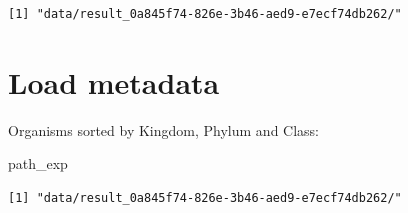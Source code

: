 \documentclass[
  letterpaper,
  DIV=11,
  numbers=noendperiod]{scrreprt}
\newenvironment{Shaded}{}{}
\newcommand{\NormalTok}[1]{\textcolor[rgb]{0.67,0.70,0.75}{#1}}
\begin{document}
\begin{verbatim}
[1] "data/result_0a845f74-826e-3b46-aed9-e7ecf74db262/"
\end{verbatim}

\hypertarget{load-metadata}{%
\section{Load metadata}\label{load-metadata}}

Organisms sorted by Kingdom, Phylum and Class:

\begin{Shaded}
\begin{Highlighting}[]
\NormalTok{path\_exp}
\end{Highlighting}
\end{Shaded}

\begin{verbatim}
[1] "data/result_0a845f74-826e-3b46-aed9-e7ecf74db262/"
\end{verbatim}
\end{document}
